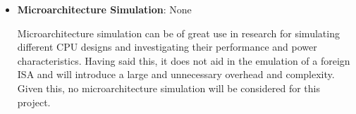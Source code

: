 \begin{itemize}
    \item \textbf{Microarchitecture Simulation}: None
    
    Microarchitecture simulation can be of great use in research for simulating different CPU designs and investigating their performance and power characteristics. Having said this, it does not aid in the emulation of a foreign ISA and will introduce a large and unnecessary overhead and complexity. Given this, no microarchitecture simulation will be considered for this project.
\end{itemize}
